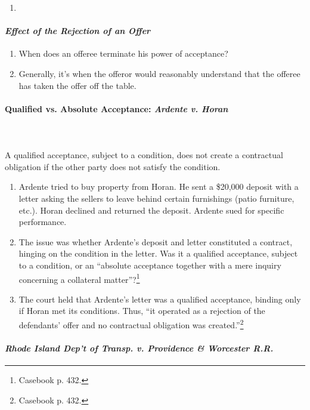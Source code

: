 \begin{enumerate}
    \item %
\end{enumerate}

\paragraph{\emph{Effect of the Rejection of an Offer}}

\begin{enumerate}
    \item When does an offeree terminate his power of acceptance?
    \item Generally, it's when the offeror would reasonably understand that 
    the offeree has taken the offer off the table.
\end{enumerate}

\paragraph{Qualified vs. Absolute Acceptance: \emph{Ardente v. Horan}}
~\\\\
A qualified acceptance, subject to a condition, does not create a contractual 
obligation if the other party does not satisfy the condition.

\begin{enumerate}
    \item Ardente tried to buy property from Horan. He sent a \$20,000 deposit 
    with a letter asking the sellers to leave behind certain furnishings 
    (patio furniture, etc.). Horan declined and returned the deposit. Ardente 
    sued for specific performance.
    \item The issue was whether Ardente's deposit and letter constituted a 
    contract, hinging on the condition in the letter. Was it a qualified 
    acceptance, subject to a condition, or an ``absolute acceptance together 
    with a mere inquiry concerning a collateral matter''?\footnote{Casebook 
    p. 432.}
    \item The court held that Ardente's letter was a qualified acceptance, 
    binding only if Horan met its conditions. Thus, ``it operated as a 
    rejection of the defendants' offer and no contractual obligation was 
    created.''\footnote{Casebook p. 432.}
\end{enumerate}

\paragraph{\emph{Rhode Island Dep't of Transp. v. Providence \& Worcester 
R.R.}}

